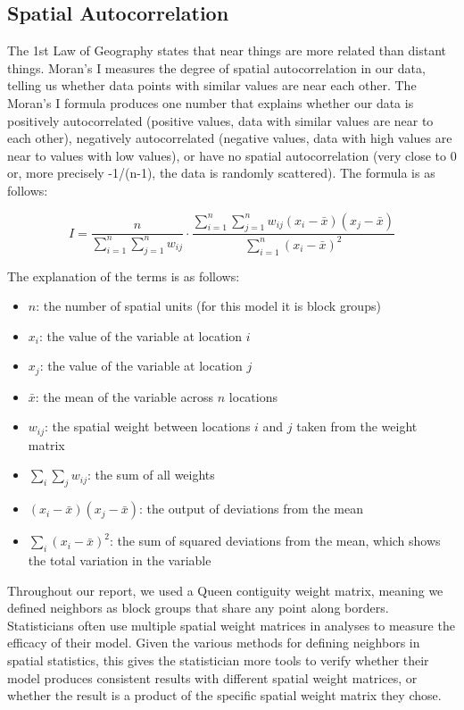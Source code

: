 \documentclass[
  12pt,
]{article}
\providecommand{\tightlist}{%
  \setlength{\itemsep}{0pt}\setlength{\parskip}{0pt}}
\begin{document}
\subsection{Spatial Autocorrelation}\label{spatial-autocorrelation}

The 1st Law of Geography states that near things are more related than
distant things. Moran's I measures the degree of spatial autocorrelation
in our data, telling us whether data points with similar values are near
each other. The Moran's I formula produces one number that explains
whether our data is positively autocorrelated (positive values, data
with similar values are near to each other), negatively autocorrelated
(negative values, data with high values are near to values with low
values), or have no spatial autocorrelation (very close to 0 or, more
precisely -1/(n-1), the data is randomly scattered). The formula is as
follows:

\[I = \frac{n}{\sum_{i=1}^{n}\sum_{j=1}^{n} w_{ij}} \cdot \frac{\sum_{i=1}^{n}\sum_{j=1}^{n} w_{ij}(x_i - \bar{x})(x_j - \bar{x})}{\sum_{i=1}^{n}(x_i - \bar{x})^2}\]

The explanation of the terms is as follows:

\begin{itemize}
\tightlist
\item
  \(n\): the number of spatial units (for this model it is block groups)
\item
  \(x_i\): the value of the variable at location \(i\)
\item
  \(x_j\): the value of the variable at location \(j\)
\item
  \(\bar{x}\): the mean of the variable across \(n\) locations
\item
  \(w_{ij}\): the spatial weight between locations \(i\) and \(j\) taken
  from the weight matrix
\item
  \(\sum_{i}\sum_{j} w_{ij}\): the sum of all weights
\item
  \((x_i - \bar{x}) (x_j - \bar{x})\): the output of deviations from the
  mean
\item
  \(\sum_{i}(x_i - \bar{x})^2\): the sum of squared deviations from the
  mean, which shows the total variation in the variable
\end{itemize}

Throughout our report, we used a Queen contiguity weight matrix, meaning
we defined neighbors as block groups that share any point along borders.
Statisticians often use multiple spatial weight matrices in analyses to
measure the efficacy of their model. Given the various methods for
defining neighbors in spatial statistics, this gives the statistician
more tools to verify whether their model produces consistent results
with different spatial weight matrices, or whether the result is a
product of the specific spatial weight matrix they chose.
\end{document}
